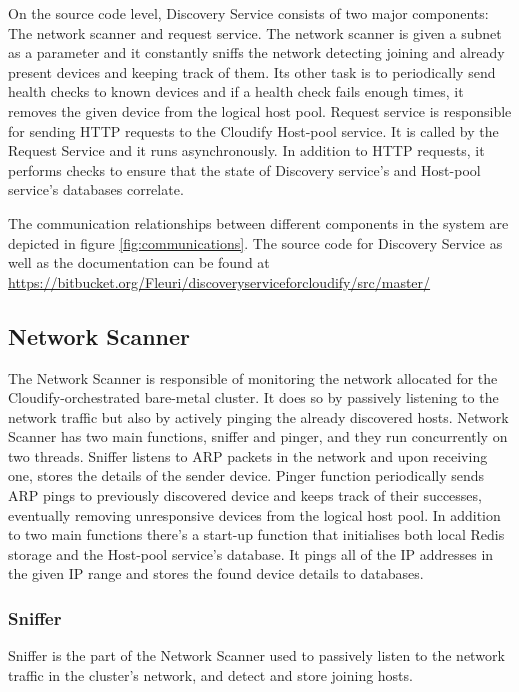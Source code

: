 On the source code level, Discovery Service consists of two major components: The network scanner and request service. The network scanner is given a subnet as a parameter and it constantly sniffs the network detecting joining and already present devices and keeping track of them. Its other task is to periodically send health checks to known devices and if a health check fails enough times, it removes the given device from the logical host pool. Request service is responsible for sending HTTP requests to the Cloudify Host-pool service. It is called by the Request Service and it runs asynchronously. In addition to HTTP requests, it performs checks to ensure that the state of Discovery service's and Host-pool service's databases correlate.

The communication relationships between different components in the system are depicted in figure \ref{fig:communications}. The source code for Discovery Service as well as the documentation can be found at \url{https://bitbucket.org/Fleuri/discoveryserviceforcloudify/src/master/}

\subsection{Network Scanner}

The Network Scanner is responsible of monitoring the network allocated for the Cloudify-orchestrated bare-metal cluster. It does so by passively listening to the network traffic but also by actively pinging the already discovered hosts. Network Scanner has two main functions, sniffer and pinger, and they run concurrently on two threads. Sniffer listens to ARP packets in the network and upon receiving one, stores the details of the sender device. Pinger function periodically sends ARP pings to previously discovered device and keeps track of their successes, eventually removing unresponsive devices from the logical host pool. In addition to two main functions there's a start-up function that initialises both local Redis storage and the Host-pool service's database. It pings all of the IP addresses in the given IP range and stores the found device details to databases.

\subsubsection{Sniffer}

Sniffer is the part of the Network Scanner used to passively listen to the network traffic in the cluster's network, and detect and store joining hosts. 

